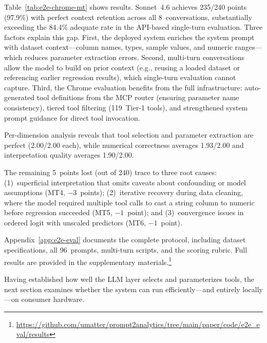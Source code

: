 Table~\ref{tab:e2e-chrome-mt} shows results.
Sonnet~4.6 achieves 235/240 points (97.9\%) with perfect context
retention across all 8~conversations, substantially exceeding the
84.4\% adequate rate in the API-based single-turn evaluation.
Three factors explain this gap.  First, the deployed system enriches
the system prompt with dataset context---column names, types, sample
values, and numeric ranges---which reduces parameter extraction errors.
Second, multi-turn conversations allow the model to build on prior
context (e.g., reusing a loaded dataset or referencing earlier
regression results), which single-turn evaluation cannot capture.
Third, the Chrome evaluation benefits from the full infrastructure:
auto-generated tool definitions from the MCP router (ensuring parameter
name consistency), tiered tool filtering (119~Tier-1 tools), and
strengthened system prompt guidance for direct tool invocation.



Per-dimension analysis reveals that tool selection and parameter
extraction are perfect (2.00/2.00 each), while numerical
correctness averages 1.93/2.00 and interpretation quality averages
1.90/2.00.

The remaining 5~points lost (out of 240) trace to three root causes:
(1)~superficial interpretation that omits caveats about confounding or
model assumptions (MT4, $-3$~points);
(2)~iterative recovery during data cleaning, where the model required
multiple tool calls to cast a string column to numeric before
regression succeeded (MT5, $-1$~point); and
(3)~convergence issues in ordered logit with unscaled predictors
(MT6, $-1$~point).

Appendix~\ref{app:e2e-eval} documents the complete protocol, including
dataset specifications, all 96~prompts, multi-turn scripts, and the
scoring rubric.  Full results are provided in the supplementary
materials.\footnote{\url{https://github.com/umatter/prompt2analytics/tree/main/paper/code/e2e_eval/results}}

Having established how well the LLM layer selects and parameterizes
tools, the next section examines whether the system can run
efficiently---and entirely locally---on consumer hardware.

